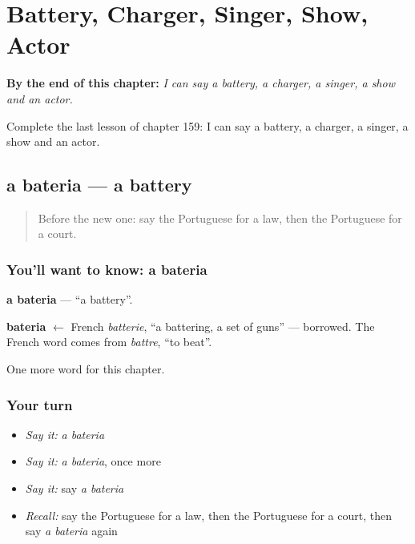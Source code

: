 
\chapter{Battery, Charger, Singer, Show, Actor}
\label{ch:pt-battery-charger-singer-show-actor}

\begin{chapteropening}
\textbf{By the end of this chapter:} \emph{I can say a battery, a charger, a singer, a show and an actor.}

Complete the last lesson of chapter 159: I can say a battery, a charger, a singer, a show and an actor.
\end{chapteropening}

\section[a bateria]{a bateria — a battery}

\label{lesson:PT-C159-bateria}



\begin{quote}
Before the new one: say the Portuguese for a law, then the Portuguese for a court.
\end{quote}

\subsection*{You'll want to know: a bateria}
\textbf{a bateria} — \textquotedblleft{}a battery\textquotedblright{}.

\begin{cousinweb}
\textbf{bateria} $\leftarrow$ French \emph{batterie}, \textquotedblleft{}a battering, a set of guns\textquotedblright{} — borrowed. The French word comes from \emph{battre}, \textquotedblleft{}to beat\textquotedblright{}.
\end{cousinweb}

\begin{grammarlens}[title={What you've built}]
One more word for this chapter.
\end{grammarlens}

\subsection*{Your turn}
\begin{itemize}
\raggedright
  \item \emph{Say it:} \emph{a bateria}
  \item \emph{Say it:} \emph{a bateria}, once more
  \item \emph{Say it:} say \emph{a bateria}
  \item \emph{Recall:} say the Portuguese for a law, then the Portuguese for a court, then say \emph{a bateria} again
\end{itemize}

